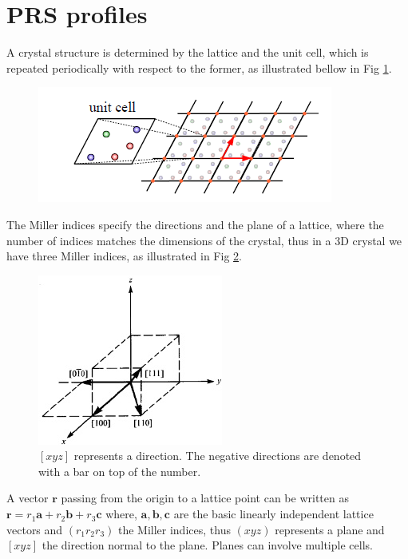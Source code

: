 \documentclass[openany,11pt,a4paper]{report}
\begin{document}
\section{PRS profiles}


A crystal structure is determined by the lattice and
the unit cell, which is repeated periodically with respect to the former, as illustrated bellow in Fig \ref{crystal}. \cite{W}


\begin{figure}[hbtp]
\centering
\includegraphics[scale=1]{Crystal.PNG}
\caption{\cite{W}}
\label{crystal}
\end{figure}

The Miller indices specify the directions and the plane of a lattice, where the number of indices matches the dimensions of the crystal, thus in a 3D crystal we have three Miller indices, as illustrated in Fig \ref{Miller}. 


\begin{figure}[H]
\centering
\includegraphics[scale=0.8]{Miller.jpg}
\caption{$[xyz]$ represents a direction. The negative directions are denoted with a bar on top of the
number. \cite{Si}}
\label{Miller}
\end{figure}



A vector $\mathbf{r}$ passing from the origin to a lattice point can be written as
 $\mathbf{r}=r_{1} \mathbf{a}+r_{2} \mathbf{b}+r_{3} \mathbf{c}$
where, $\mathbf{a}, \mathbf{b}, \mathbf{c}$ are the basic linearly independent lattice vectors and
 $\left(r_{1} r_{2} r_{3}\right)$ the Miller indices, thus $(xyz)$ represents a plane and $[xyz]$ the direction normal to the plane. Planes can involve multiple cells. \cite{Miller}\\
\end{document}
